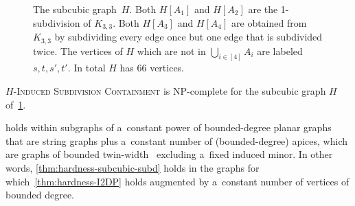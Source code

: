 \documentclass[a4paper,UKenglish,cleveref,autoref]{lipics-v2021}
\begin{document}
\begin{figure}[h!]
  \caption{The subcubic graph~$H$.
   Both $H[A_1]$ and $H[A_2]$ are the 1-subdivision of $K_{3,3}$.
  Both $H[A_3]$ and $H[A_4]$ are obtained from $K_{3,3}$ by subdividing every edge once but one edge that is subdivided twice.
  The vertices of $H$ which are not in $\bigcup_{i \in [4]} A_i$ are labeled $s, t, s', t'$.
  In total $H$ has 66 vertices.}
  \label{fig:H}
\end{figure}

\begin{theorem}\label{thm:hardness-subcubic-subd}
  \textsc{$H$-Induced Subdivision Containment} is NP-complete for the subcubic graph $H$ of~\cref{fig:H}.
\end{theorem}

 holds within subgraphs of a~constant power of bounded-degree planar graphs that are string graphs plus a~constant number of (bounded-degree) apices, which are graphs of bounded twin-width~\cite{twin-width1,twin-width2} excluding a~fixed induced minor.
In other words, \cref{thm:hardness-subcubic-subd} holds in the graphs for which~\cref{thm:hardness-I2DP} holds augmented by a~constant number of vertices of bounded degree.

\medskip
\end{document}
